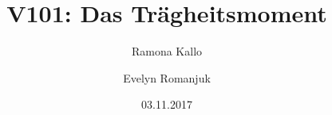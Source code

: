 


\title{V101: Das Trägheitsmoment}
\author{Ramona Kallo \and Evelyn Romanjuk}
\date{03.11.2017}
\maketitle 
\newpage
\tableofcontents
\newpage






\nocite{*}
\printbibliography

